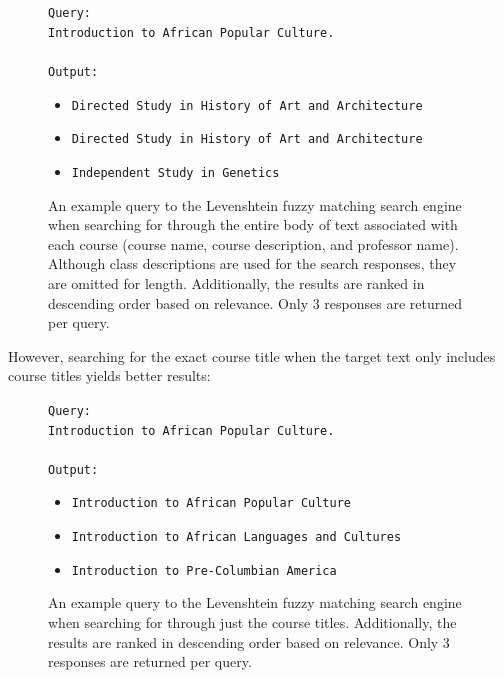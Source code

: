 \documentclass[
	a4paper, %
	10pt, %
	unnumberedsections, %
	twoside, %
]{LTJournalArticle}
\begin{document}
\begin{figure}[h]
	\begin{center}
		\texttt{Query:} \\
		\texttt{Introduction to African Popular Culture.} \\
		\texttt{}\\
		\texttt{Output:} 
		\begin{itemize}
			\item \texttt{Directed Study in History of Art and Architecture}
			\item \texttt{Directed Study in History of Art and Architecture}
			\item \texttt{Independent Study in Genetics}
		\end{itemize}		
	\end{center}
	\caption{An example query to the Levenshtein fuzzy matching search engine when searching for through the entire body of text associated with each course (course name, course description, and professor name). Although class descriptions are used for the search responses, they are omitted for length. Additionally, the results are ranked in descending order based on relevance. Only 3 responses are returned per query.}
\end{figure}

However, searching for the exact course title when the target text only includes course titles yields better results:

\begin{figure}[h]
	\begin{center}
		\texttt{Query:} \\
		\texttt{Introduction to African Popular Culture.} \\
		\texttt{}\\
		\texttt{Output:} 
		\begin{itemize}
			\item \texttt{Introduction to African Popular Culture}
			\item \texttt{Introduction to African Languages and Cultures}
			\item \texttt{Introduction to Pre-Columbian America}
		\end{itemize}		
	\end{center}
	\caption{An example query to the Levenshtein fuzzy matching search engine when searching for through just the course titles. Additionally, the results are ranked in descending order based on relevance. Only 3 responses are returned per query.}
\end{figure}
\end{document}

